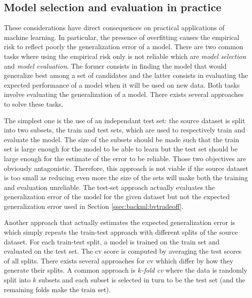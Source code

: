 \subsection{Model selection and evaluation in practice}

These considerations have direct consequences on practical applications of machine learning. In particular, the presence of overfitting causes the empirical risk to reflect poorly the generalization error of a model. There are two common tasks where using the empirical risk only is not reliable which are \textit{model selection} and \textit{model evaluation}. The former consists in finding the model that would generalize best among a set of candidates and the latter consists in evaluating the expected performance of a model when it will be used on new data. Both tasks involve evaluating the generalization of a model. There exists several approaches to solve these tasks. 

The simplest one is the use of an independant test set: the source dataset is split into two subsets, the train and test sets, which are used to respectively train and evaluate the model. The size of the subsets should be made such that the train set is large enough for the model to be able to learn but the test set should be large enough for the estimate of the error to be reliable. Those two objectives are obviously antagonistic. Therefore, this approach is not viable if the source dataset is too small as reducing even more the size of the sets will make both the training and evaluation unreliable. The test-set approach actually evaluates the generalization error of the model for the given dataset but not the expected generalization error used in Section \ref{ssec:backml:bvtradeoff}.

Another approach that actually estimates the expected generalization error is  which simply repeats the train-test approach with different splits of the source dataset. For each train-test split, a model is trained on the train set and evaluated on the test set. The \acrlong{cv} score is computed by averaging the test scores of all splits. There exists several approaches for \acrlong{cv} whhich differ by how they generate their splits. A common approach is \textit{$k$-fold \acrlong{cv}} where the data is randomly split into $k$ subsets and each subset is selected in turn to be the test set (and the remaining folds make the train set). 

